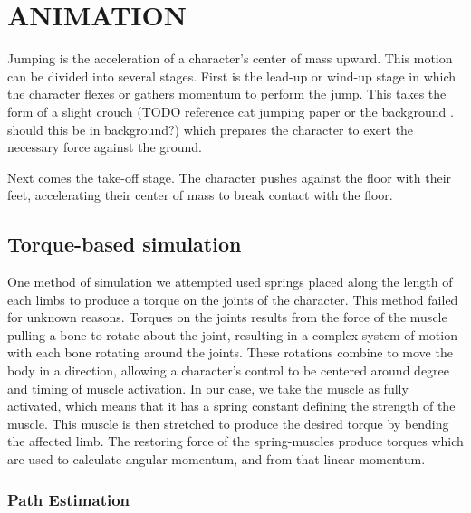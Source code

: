  
\chapter{ANIMATION}
\label{chapter:animation}

Jumping is the acceleration of a character's center of mass upward.  This motion can be divided into several stages.  First is the lead-up or wind-up stage in which the character flexes or gathers momentum to perform the jump.  This takes the form of a slight crouch (TODO reference cat jumping paper or the background .  should this be in background?) which prepares the character to exert the necessary force against the ground.  

Next comes the take-off stage.  The character pushes against the floor with their feet, accelerating their center of mass to break contact with the floor.  

\section{Torque-based simulation}
One method of simulation we attempted used springs placed along the length of each limbs to produce a torque on the joints of the character.  This method failed for unknown reasons.  Torques on the joints results from the force of the muscle pulling a bone to rotate about the joint, resulting in a complex system of motion with each bone rotating around the joints.  These rotations combine to move the body in a direction, allowing a character's control to be centered around degree and timing of muscle activation. \cite{muscle_based_bipeds}  In our case, we take the muscle as fully activated, which means that it has a spring constant defining the strength of the muscle.  This muscle is then stretched to produce the desired torque by bending the affected limb.  The restoring force of the spring-muscles produce torques which are used to calculate angular momentum, and from that linear momentum.  

\subsection{Path Estimation}

